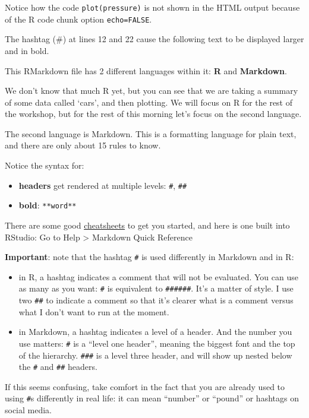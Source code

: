\documentclass[]{book}
\providecommand{\tightlist}{%
  \setlength{\itemsep}{0pt}\setlength{\parskip}{0pt}}
\begin{document}
Notice how the code \texttt{plot(pressure)} is not shown in the HTML output because of the R code chunk option \texttt{echo=FALSE}.

The hashtag (\#) at lines 12 and 22 cause the following text to be displayed larger and in bold.

This RMarkdown file has 2 different languages within it: \textbf{R} and \textbf{Markdown}.

We don't know that much R yet, but you can see that we are taking a summary of some data called `cars', and then plotting. We will focus on R for the rest of the workshop, but for the rest of this morning let's focus on the second language.

The second language is Markdown. This is a formatting language for plain text, and there are only about 15 rules to know.

Notice the syntax for:

\begin{itemize}
\tightlist
\item
  \textbf{headers} get rendered at multiple levels: \texttt{\#}, \texttt{\#\#}
\item
  \textbf{bold}: \texttt{**word**}
\end{itemize}

There are some good \href{https://github.com/adam-p/markdown-here/wiki/Markdown-Here-Cheatsheet}{cheatsheets} to get you started, and here is one built into RStudio: Go to Help \textgreater{} Markdown Quick Reference

\textbf{Important}: note that the hashtag \texttt{\#} is used differently in Markdown and in R:

\begin{itemize}
\tightlist
\item
  in R, a hashtag indicates a comment that will not be evaluated. You can use as many as you want: \texttt{\#} is equivalent to \texttt{\#\#\#\#\#\#}. It's a matter of style. I use two \texttt{\#\#} to indicate a comment so that it's clearer what is a comment versus what I don't want to run at the moment.
\item
  in Markdown, a hashtag indicates a level of a header. And the number you use matters: \texttt{\#} is a ``level one header'', meaning the biggest font and the top of the hierarchy. \texttt{\#\#\#} is a level three header, and will show up nested below the \texttt{\#} and \texttt{\#\#} headers.
\end{itemize}

If this seems confusing, take comfort in the fact that you are already used to using \texttt{\#}s differently in real life: it can mean ``number'' or ``pound'' or hashtags on social media.
\end{document}
